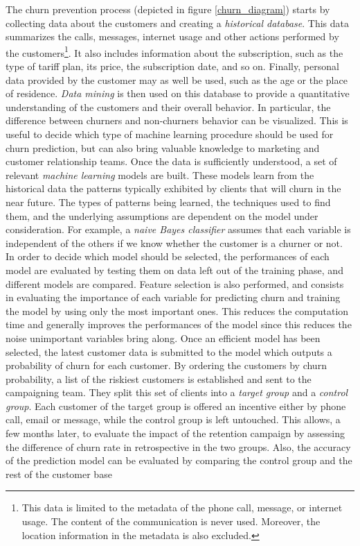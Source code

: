 The churn prevention process (depicted in figure \ref{churn_diagram}) starts by
collecting data about the customers and creating a \emph{historical database}.
This data summarizes the calls, messages, internet usage and other actions
performed by the customers\footnote{This data is limited to the metadata of the
phone call, message, or internet usage. The content of the communication is
never used. Moreover, the location information in the metadata is also
excluded.}. It also includes information about the subscription, such as the
type of tariff plan, its price, the subscription date, and so on. Finally,
personal data provided by the customer may as well be used, such as the age or
the place of residence. \emph{Data mining} is then used on this database to
provide a quantitative understanding of the customers and their overall
behavior. In particular, the difference between churners and non-churners
behavior can be visualized. This is useful to decide which type of machine
learning procedure should be used for churn prediction, but can also bring
valuable knowledge to marketing and customer relationship teams. Once the data
is sufficiently understood, a set of relevant \emph{machine learning} models are
built. These models learn from the historical data the patterns typically
exhibited by clients that will churn in the near future. The types of patterns
being learned, the techniques used to find them, and the underlying assumptions
are dependent on the model under consideration. For example, a \emph{naive Bayes
classifier} assumes that each variable is independent of the others if we know
whether the customer is a churner or not. In order to decide which model should
be selected, the performances of each model are evaluated by testing them on
data left out of the training phase, and different models are compared. Feature
selection is also performed, and consists in evaluating the importance of each
variable for predicting churn and training the model by using only the most
important ones. This reduces the computation time and generally improves the
performances of the model since this reduces the noise unimportant variables
bring along. Once an efficient model has been selected, the latest customer data
is  submitted to the model which outputs a probability of churn for each
customer. By ordering the customers by churn probability, a list of the riskiest
customers is established and sent to the campaigning team. They split this set
of clients into a \emph{target group} and a \emph{control group}. Each customer
of the target group is offered an incentive either by phone call, email or
message, while the control group is left untouched. This allows, a few months
later, to evaluate the impact of the retention campaign by assessing the
difference of churn rate in retrospective in the two groups. Also, the accuracy
of the prediction model can be evaluated by comparing the control group and the
rest of the customer base

